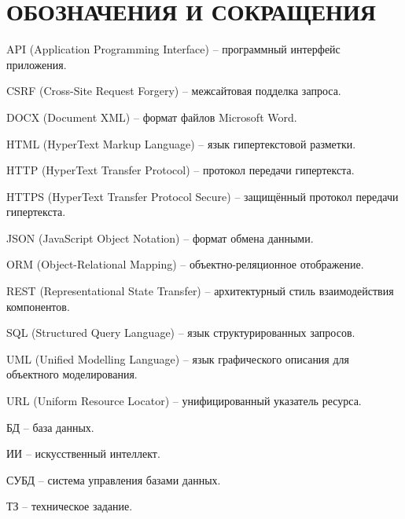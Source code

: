 \section*{ОБОЗНАЧЕНИЯ И СОКРАЩЕНИЯ}

API (Application Programming Interface) -- программный интерфейс приложения.

CSRF (Cross-Site Request Forgery) -- межсайтовая подделка запроса.

DOCX (Document XML) -- формат файлов Microsoft Word.

HTML (HyperText Markup Language) -- язык гипертекстовой разметки.

HTTP (HyperText Transfer Protocol) -- протокол передачи гипертекста.

HTTPS (HyperText Transfer Protocol Secure) -- защищённый протокол передачи гипертекста.

JSON (JavaScript Object Notation) -- формат обмена данными.

ORM (Object-Relational Mapping) -- объектно-реляционное отображение.

REST (Representational State Transfer) -- архитектурный стиль взаимодействия компонентов.

SQL (Structured Query Language) -- язык структурированных запросов.

UML (Unified Modelling Language) -- язык графического описания для объектного моделирования.

URL (Uniform Resource Locator) -- унифицированный указатель ресурса.

БД -- база данных.

ИИ -- искусственный интеллект.

СУБД -- система управления базами данных.

ТЗ -- техническое задание.